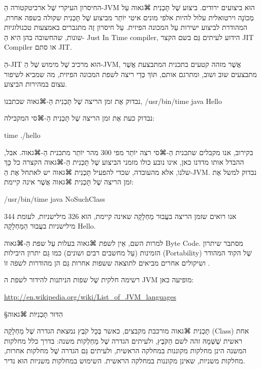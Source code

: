 החיסרון העיקרי שֶׁל ארכיטקטורה הַ-JVM הוּא ביצועים ירודים. ביצוע שֶׁל תָּכְנִית
⌘גאוה עַל מְכוֹנָה וירטואלית עלול להיות אלפי מונים איטי יוֹתֵר מביצוע שֶׁל
תָּכְנִית שקולה בשפה אחרת, המהודרת לביצוע ישירות עַל המכונה הפיזית. עַל חיסרון
זֶה מתגברים באמצעות טכנולוגיות שונות, שהחשובה בהן הִיא הַ-  Just In Time
compiler, הידוע לעיתים גַּם בשם הקצר JIT Compiler או סתם JIT.

הַ-JIT הוּא מרכיב שֶׁל מימוש שֶׁל הַ-JVM, אֲשֶׁר מזהה קטעים בתכנית המתבצעת
אֲשֶׁר מתבצעים שוב ושוב, ומתרגם אותם, תּוֹךְ כְּדֵי ריצה לשפת המכונה הפיזית, מה
שמביא לשיפור עצום במהירות הביצוע.

נבדוק אֶת זמן הריצה שֶׁל תָּכְנִית הַ-⌘גאוה שכתבנו,
/usr/bin/time java Hello
\END

נבדוק כעת אֶת זמן הריצה שֶׁל תָּכְנִית הַ-⌘סי המקבילה:

time ./hello
\END

בקירוב, אנו מקבלים שתכנית הַ-⌘סי רצה יוֹתֵר מפי 300 מהר יוֹתֵר מתכנית הַ-⌘גאוה.
אבל, ההבדל אותו מדדנו כאן, אינו נובע כולו מזמני הביצוע שֶׁל תָּכְנִית הַ-⌘גאוה
הקצרה כל כָּךְ שלנו, אלא מהעובדה, שכדי להפעיל תָּכְנִית ⌘גאוה יש לאתחל אֶת
הַ-JVM. נבדוק למשל אֶת זמן הריצה שֶׁל תָּכְנִית ⌘גאוה אֲשֶׁר אינה קיימת:

/usr/bin/time java NoSuchClass
\END

אנו רואים שזמן הריצה בעֲבוּר מַחְלָקָה שאינה קיימת, הוא 326 מילישניות, לעומת 344
מילישניות בעֲבוּר הַמַּחְלָקָה Hello.

למרות השם, אֵין לשפת ⌘גאוה בעלות עַל שפת הַ-⌘גאוה Byte Code. מסתבר שיתרון הזמינות
(עַל מחשבים רבים ושונים) כמו גַּם יתרון היבילות (Portability) שֶׁל הקוד המהודר
ושיקולים אחרים מביאים לתוצאה ששפות אחרות גַּם הן מהודרות לשפה זוֹ .


רשימה חלקית שֶׁל שפות הניתנות להידור לשפת ה JVM מופיעה כאן:

\begin{english}
\url{http://en.wikipedia.org/wiki/List_of_JVM_languages}
\end{english}

§הִדּוּר תָּכְנִיּוֹת ⌘גאוה

תָּכְנִית ⌘גאוה מורכבת מקבצים, כאשר בְּכָל קֹבֶץ נמצאת הגדרה שֶׁל מַחְלָקָה
(Class)
 אחת ראשית שֶׁשְּׁמָהּ זהה לשם הַקֹּבֶץ, 
ולעיתים הגדרה שֶׁל מַחְלְקוֹת
משנה: בדרך כלל מחלקות המשנה הינן מחלקות מקוננות במחלקה הראשית, ולעיתים גַּם
הגדרה שֶׁל מחלקות אחרות, מחלקות משניות, שאינן מקוננות במחלקה הראשית. השימוש
במחלקות משניות הוּא נדיר.

